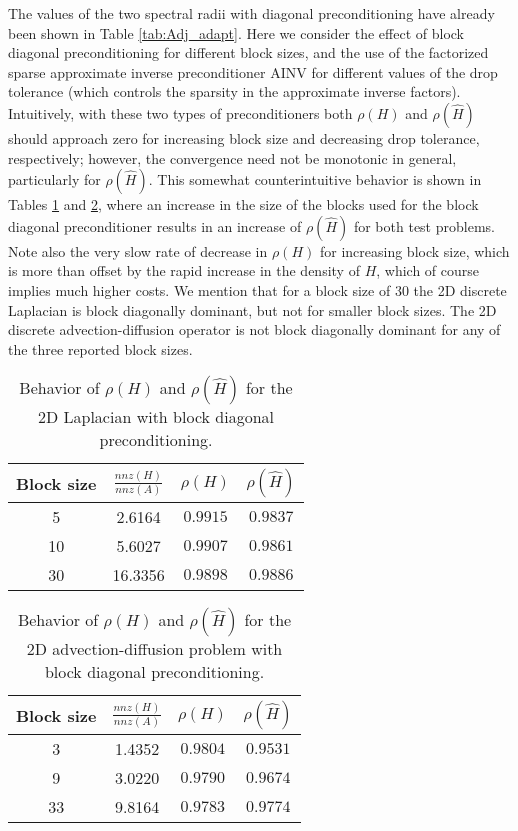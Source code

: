 \documentclass[final,leqno,onefignum,onetabnum]{siamltex1213}
\begin{document}
The values of the two spectral radii with
diagonal preconditioning have already been shown in Table
\ref{tab:Adj_adapt}.
Here we consider the effect of 
block diagonal preconditioning for different block sizes,
and the use of the factorized sparse approximate inverse 
preconditioner AINV \cite{BMT1996,BT1998}
for different values of the drop tolerance (which controls the
sparsity in the approximate inverse factors). 
Intuitively, with these two types of preconditioners both $\rho(H)$ and $\rho(\hat{H})$
should approach zero for increasing block size and decreasing
drop tolerance, respectively; however, the convergence need
not be monotonic in general, particularly for $\rho(\hat{H})$.
This somewhat counterintuitive
behavior is shown in Tables \ref{tab:lap2d_block} and \ref{tab:ifiss_block},
where an increase in the size of the blocks used for the block diagonal
preconditioner results in an increase of $\rho(\hat{H})$ for both test problems. 
Note also the very slow rate of decrease in $\rho(H)$ for increasing block
size, which is more than offset by the rapid increase in the density of $H$,
which of course implies much higher costs.
We mention that for a block size of 30 the 2D discrete Laplacian is
block diagonally dominant, but not for smaller block sizes. The 2D
discrete advection-diffusion operator is not block diagonally dominant
for any of the three reported block sizes.


\begin{table}[!t]
\centering
\begin{tabular}{|c|c|c|c|}
\hline
\textbf{Block size} & \textbf{$\frac{nnz(H)}{nnz(A)}$}& $\rho(H)$
&$\rho(\hat{H})$\\
\hline
 5 & 2.6164 & $0.9915$ & $0.9837$\\
\hline
 10 & 5.6027 & $0.9907$ & $0.9861$\\
\hline
 30 & 16.3356 & $0.9898$  & $0.9886$\\
\hline
\end{tabular}
\caption{Behavior of $\rho(H)$ and $\rho(\hat{H})$ for the
2D Laplacian with block diagonal preconditioning.}
\label{tab:lap2d_block}
\end{table}


\begin{table}[!t]
\centering
\begin{tabular}{|c|c|c|c|}
\hline
\textbf{Block size} & \textbf{$\frac{nnz(H)}{nnz(A)}$}& $\rho(H)$
&$\rho(\hat{H})$\\
\hline
 3 & 1.4352 & $0.9804$ & $0.9531$\\
\hline
 9 & 3.0220 & $0.9790$ & $0.9674$\\
\hline
 33 & 9.8164 & $0.9783$  & $0.9774$\\
\hline
\end{tabular}
\caption{Behavior of $\rho(H)$ and $\rho(\hat{H})$ for the 
2D advection-diffusion problem with block diagonal preconditioning.}
\label{tab:ifiss_block}
\end{table}
\end{document}
